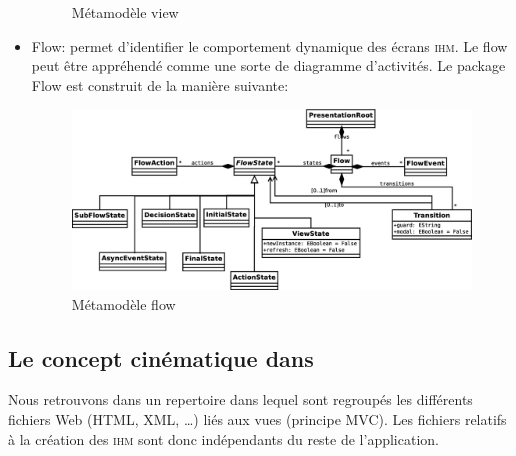 \begin{itemize}
\begin{figure}[H]
  \caption{Métamodèle view}
  \label{fig:Métamodèle View}
\end{figure}
  \item Flow: permet d'identifier le comportement dynamique des écrans \textsc{ihm}. Le flow peut être appréhendé comme une sorte de diagramme d'activités.
\newline
Le package Flow est construit de la manière suivante:
\newline
\begin{figure}[H]
  \centering
  \includegraphics[scale=.3]{img/flow.eps}
  \caption{Métamodèle flow}
  \label{fig:Métamodèle Flow}
\end{figure}
\end{itemize}
\subsection{Le concept cinématique dans \kwplay{}}
Nous retrouvons dans \kwplay{} un repertoire dans lequel sont regroupés les différents fichiers Web (HTML, XML, …) liés aux vues (principe MVC). Les fichiers relatifs à la création des \textsc{ihm} sont donc indépendants du reste de l'application.   
